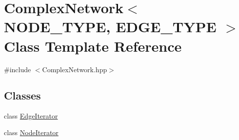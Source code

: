 \hypertarget{class_complex_network}{\section{Complex\+Network$<$ N\+O\+D\+E\+\_\+\+T\+Y\+P\+E, E\+D\+G\+E\+\_\+\+T\+Y\+P\+E $>$ Class Template Reference}
\label{class_complex_network}
}


{\ttfamily \#include $<$Complex\+Network.\+hpp$>$}

\subsection*{Classes}
\begin{DoxyCompactItemize}
\item 
class \hyperlink{class_complex_network_1_1_edge_iterator}{Edge\+Iterator}
\item 
class \hyperlink{class_complex_network_1_1_node_iterator}{Node\+Iterator}
\end{DoxyCompactItemize}
